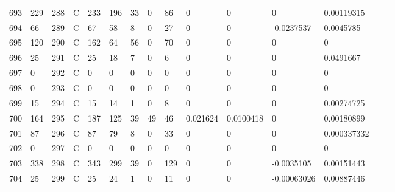 \begin{longtable}{lllllllllllllll}
	693 & 229               & 288 & C   & 233               & 196               & 33                & 0    & 86         & 0              & 0              & 0             & 0.00119315   \\
	694 & 66                & 289 & C   & 67                & 58                & 8                 & 0    & 27         & 0              & 0              & -0.0237537    & 0.0045785    \\
	695 & 120               & 290 & C   & 162               & 64                & 56                & 0    & 70         & 0              & 0              & 0             & 0            \\
	696 & 25                & 291 & C   & 25                & 18                & 7                 & 0    & 6          & 0              & 0              & 0             & 0.0491667    \\
	697 & 0                 & 292 & C   & 0                 & 0                 & 0                 & 0    & 0          & 0              & 0              & 0             & 0            \\
	698 & 0                 & 293 & C   & 0                 & 0                 & 0                 & 0    & 0          & 0              & 0              & 0             & 0            \\
	699 & 15                & 294 & C   & 15                & 14                & 1                 & 0    & 8          & 0              & 0              & 0             & 0.00274725   \\
	700 & 164               & 295 & C   & 187               & 125               & 39                & 49   & 46         & 0.021624       & 0.0100418      & 0             & 0.00180899   \\
	701 & 87                & 296 & C   & 87                & 79                & 8                 & 0    & 33         & 0              & 0              & 0             & 0.000337332  \\
	702 & 0                 & 297 & C   & 0                 & 0                 & 0                 & 0    & 0          & 0              & 0              & 0             & 0            \\
	703 & 338               & 298 & C   & 343               & 299               & 39                & 0    & 129        & 0              & 0              & -0.0035105    & 0.00151443   \\
	704 & 25                & 299 & C   & 25                & 24                & 1                 & 0    & 11         & 0              & 0              & -0.00063026   & 0.00887446   \\

\end{longtable}
